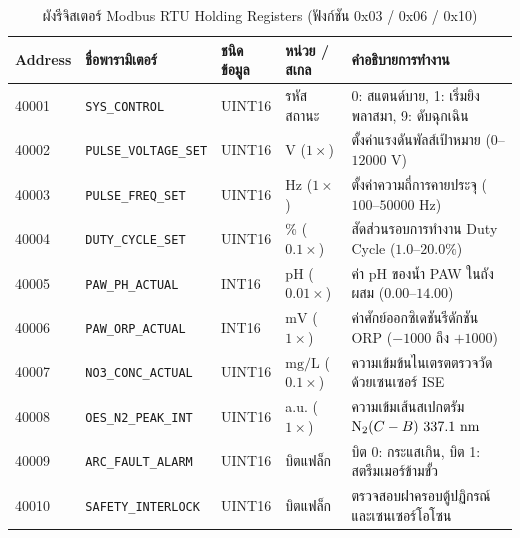 \begin{table}[H]
\centering
\caption{ผังรีจิสเตอร์ Modbus RTU Holding Registers (ฟังก์ชัน 0x03 / 0x06 / 0x10)}
\label{tab:app_modbus_map}
\begin{tabularx}{\textwidth}{l l l l X}
\toprule
\textbf{Address} & \textbf{ชื่อพารามิเตอร์} & \textbf{ชนิดข้อมูล} & \textbf{หน่วย / สเกล} & \textbf{คำอธิบายการทำงาน} \\
\midrule
40001 & \texttt{SYS\_CONTROL} & UINT16 & รหัสสถานะ & 0: สแตนด์บาย, 1: เริ่มยิงพลาสมา, 9: ดับฉุกเฉิน \\
40002 & \texttt{PULSE\_VOLTAGE\_SET} & UINT16 & $\si{\volt}$ ($1\times$) & ตั้งค่าแรงดันพัลส์เป้าหมาย ($0$--$12000\text{ V}$) \\
40003 & \texttt{PULSE\_FREQ\_SET} & UINT16 & $\si{\hertz}$ ($1\times$) & ตั้งค่าความถี่การคายประจุ ($100$--$50000\text{ Hz}$) \\
40004 & \texttt{DUTY\_CYCLE\_SET} & UINT16 & \% ($0.1\times$) & สัดส่วนรอบการทำงาน Duty Cycle ($1.0$--$20.0\%$) \\
40005 & \texttt{PAW\_PH\_ACTUAL} & INT16 & pH ($0.01\times$) & ค่า pH ของน้ำ PAW ในถังผสม ($0.00$--$14.00$) \\
40006 & \texttt{PAW\_ORP\_ACTUAL} & INT16 & $\si{\milli\volt}$ ($1\times$) & ค่าศักย์ออกซิเดชันรีดักชัน ORP ($-1000$ ถึง $+1000$) \\
40007 & \texttt{NO3\_CONC\_ACTUAL} & UINT16 & $\si{\milli\gram\per\liter}$ ($0.1\times$) & ความเข้มข้นไนเตรตตรวจวัดด้วยเซนเซอร์ ISE \\
40008 & \texttt{OES\_N2\_PEAK\_INT} & UINT16 & a.u. ($1\times$) & ความเข้มเส้นสเปกตรัม $\ce{N2}(C-B)\ 337.1\text{ nm}$ \\
40009 & \texttt{ARC\_FAULT\_ALARM} & UINT16 & บิตแฟล็ก & บิต 0: กระแสเกิน, บิต 1: สตรีมเมอร์ข้ามขั้ว \\
40010 & \texttt{SAFETY\_INTERLOCK} & UINT16 & บิตแฟล็ก & ตรวจสอบฝาครอบตู้ปฏิกรณ์และเซนเซอร์โอโซน \\
\bottomrule
\end{tabularx}
\end{table}

\clearpage
